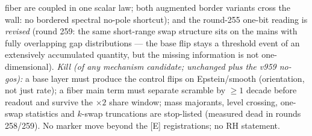 \documentclass[11pt,a4paper]{article}
\begin{document}
{fiber are coupled in one scalar law; both augmented border
variants cross the wall: no bordered spectral no-pole shortcut);
and the round-255 one-bit reading is \emph{revised} (round 259:
the same short-range swap structure sits on the mains with fully
overlapping gap distributions --- the base flip stays a threshold
event of an extensively accumulated quantity, but the missing
information is not one-dimensional).  \emph{Kill (of any
mechanism candidate; unchanged plus the v959 no-gos):} a base
layer must produce the control flips on Epstein/smooth
(orientation, not just rate); a fiber main term must separate
scramble by $\ge 1$ decade before readout and survive the
$\times2$ share window; mass majorants, level crossing, one-swap
statistics and $k$-swap truncations are stop-listed (measured
dead in rounds 258/259).  No marker move beyond the [E]
registrations; no RH statement.\par}
\end{document}
